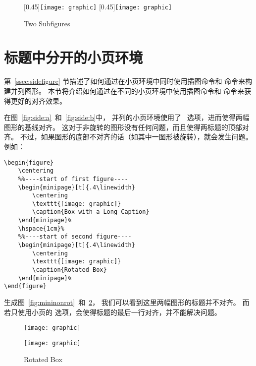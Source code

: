 \begin{figure}
	\centering
	[0.45\linewidth]{\texttt{[image: graphic]}}
	\hfill
	[0.45\linewidth]{\texttt{[image: graphic]}}
	\caption{Two Subfigures}
	\label{fig:specwid:subfig} %
\end{figure}

\section{标题中分开的小页环境}

第~\ref{ssec:sidefigure} 节描述了如何通过在小页环境中同时使用插图命令和  命令来构建并列图形。
本节将介绍如何通过在不同的小页环境中使用插图命令和  命令来获得更好的对齐效果。

在图~\ref{fig:side:a}~和~\ref{fig:side:b}中，
并列的小页环境使用了 \opt{[t]}~选项，进而使得两幅图形的基线对齐。
这对于非旋转的图形没有任何问题，而且使得两标题的顶部对齐。
不过，如果图形的底部不对齐的话（如其中一图形被旋转），就会发生问题。例如：
\begin{lstlisting}
\begin{figure}
	\centering
	%%----start of first figure----
	\begin{minipage}[t]{.4\linewidth}
		\centering
		\texttt{[image: graphic]}
		\caption{Box with a Long Caption}
	\end{minipage}%
	\hspace{1cm}%
	%%----start of second figure----
	\begin{minipage}[t]{.4\linewidth}
		\centering
		\texttt{[image: graphic]}
		\caption{Rotated Box}
	\end{minipage}%
\end{figure}
\end{lstlisting}
生成图~\ref{fig:mininonrot}~和~\ref{fig:minirot}，
我们可以看到这里两幅图形的标题并不对齐。
而若只使用小页的 \opt{[b]} 选项，会使得标题的最后一行对齐，并不能解决问题。

\begin{figure}
	\centering
	\begin{minipage}[t]{.4\linewidth}
		\centering
		\texttt{[image: graphic]}
		\caption{Box with a Long Caption}\label{fig:mininonrot} 
	\end{minipage}%
	\hspace{1cm}%
	\begin{minipage}[t]{.4\linewidth}
		\centering
		\texttt{[image: graphic]}
		\caption{Rotated Box}\label{fig:minirot} 
	\end{minipage}%
\end{figure}

